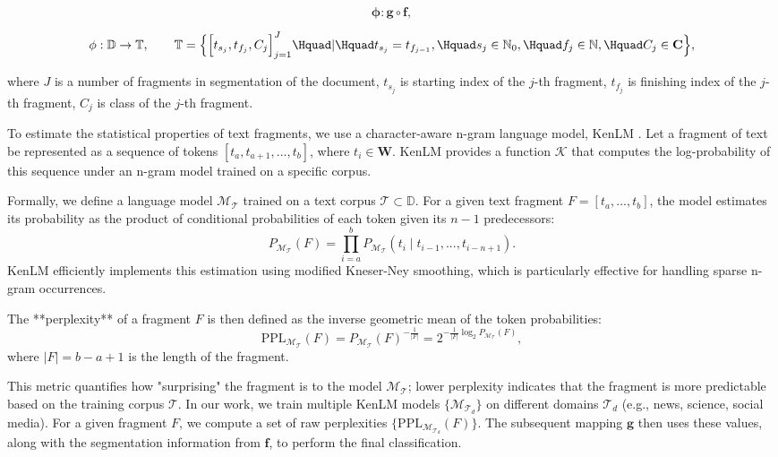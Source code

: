\documentclass{article}
\begin{document}
$$\mathbf{\phi} : \mathbf{g} \circ \mathbf{f},$$


$$\mathbf{\phi}: \mathbb{D} \rightarrow \mathbb{T}, \qquad \mathbb{T} = \Bigl\{\Big[t_{s_j}, t_{f_j}, C_j\Big]_{j = 1}^{J} \Hquad|\Hquad t_{s_j} = t_{f_{j - 1}},\Hquad s_j \in \mathbb{N}_0,\Hquad f_j \in \mathbb{N}, \Hquad C_j \in \mathbf{C}\Bigr\},$$

where $J$ is a number of fragments in segmentation of the document, $t_{s_j}$ is starting index of the $j$-th fragment,  $t_{f_j}$ is finishing index of the $j$-th fragment,  $C_{j}$ is class of the $j$-th fragment.


To estimate the statistical properties of text fragments, we use a character-aware n-gram language model, KenLM \cite{chen1996empirical}. Let a fragment of text be represented as a sequence of tokens $[t_a, t_{a+1}, ..., t_b]$, where $t_i \in \mathbf{W}$. KenLM provides a function $\mathcal{K}$ that computes the log-probability of this sequence under an n-gram model trained on a specific corpus.

Formally, we define a language model $\mathcal{M}_{\mathcal{T}}$ trained on a text corpus $\mathcal{T} \subset \mathbb{D}$. For a given text fragment $F = [t_{a}, ..., t_{b}]$, the model estimates its probability as the product of conditional probabilities of each token given its $n-1$ predecessors:
\begin{equation}
    P_{\mathcal{M}_{\mathcal{T}}}(F) = \prod_{i=a}^{b} P_{\mathcal{M}_{\mathcal{T}}}(t_i \mid t_{i-1}, ..., t_{i-n+1}).
\end{equation}
KenLM efficiently implements this estimation using modified Kneser-Ney smoothing, which is particularly effective for handling sparse n-gram occurrences.

The **perplexity** of a fragment $F$ is then defined as the inverse geometric mean of the token probabilities:
\begin{equation}
    \text{PPL}_{\mathcal{M}_{\mathcal{T}}}(F) = P_{\mathcal{M}_{\mathcal{T}}}(F)^{-\frac{1}{|F|}} = 2^{-\frac{1}{|F|}\log_2 P_{\mathcal{M}_{\mathcal{T}}}(F)},
\end{equation}
where $|F| = b-a+1$ is the length of the fragment.

This metric quantifies how "surprising" the fragment is to the model $\mathcal{M}_{\mathcal{T}}$; lower perplexity indicates that the fragment is more predictable based on the training corpus $\mathcal{T}$. In our work, we train multiple KenLM models $\{\mathcal{M}_{\mathcal{T}_d}\}$ on different domains $\mathcal{T}_d$ (e.g., news, science, social media). For a given fragment $F$, we compute a set of raw perplexities $\{\text{PPL}_{\mathcal{M}_{\mathcal{T}_d}}(F)\}$. The subsequent mapping $\mathbf{g}$ then uses these values, along with the segmentation information from $\mathbf{f}$, to perform the final classification.
\end{document}
